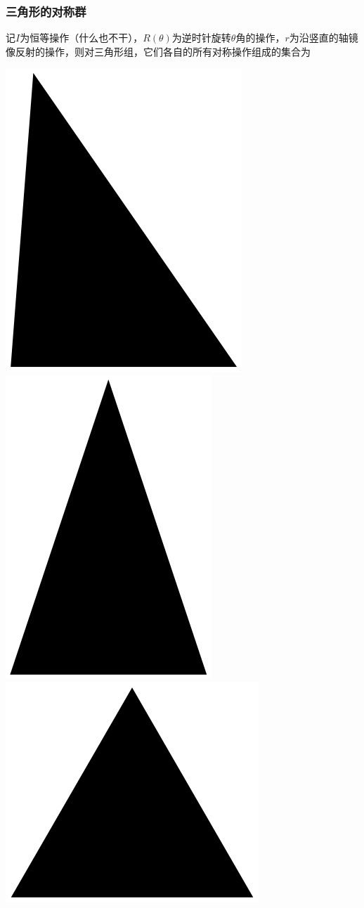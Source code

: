\documentclass[CJK]{beamer}
\begin{document}
\begin{frame}
\frametitle{\bch 三角形的对称群 \ech}
\bch
记$I$为恒等操作（什么也不干），$R(\theta)$为逆时针旋转$\theta$角的操作，$r$为沿竖直的轴镜像反射的操作，则对三角形组，它们各自的所有对称操作组成的集合为
\begin{center}
\includegraphics[scale=0.2]{tri}
\includegraphics[scale=0.2]{etri}
\includegraphics[scale=0.2]{rtri}

\end{center}
\end{frame}
\end{document}
